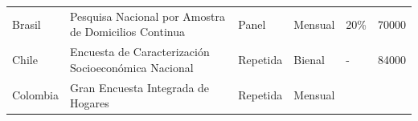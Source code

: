 \begin{longtable}[]{@{}llllll@{}}
\begin{minipage}[t]{0.13\columnwidth}
Brasil\strut
\end{minipage} & \begin{minipage}[t]{0.38\columnwidth}\raggedright
Pesquisa Nacional por Amostra de Domicilios Continua\strut
\end{minipage} & \begin{minipage}[t]{0.06\columnwidth}\raggedright
Panel\strut
\end{minipage} & \begin{minipage}[t]{0.08\columnwidth}\raggedright
Mensual\strut
\end{minipage} & \begin{minipage}[t]{0.06\columnwidth}\raggedright
20\%\strut
\end{minipage} & \begin{minipage}[t]{0.13\columnwidth}\raggedright
70000\strut
\end{minipage}\tabularnewline
\begin{minipage}[t]{0.13\columnwidth}\raggedright
Chile\strut
\end{minipage} & \begin{minipage}[t]{0.38\columnwidth}\raggedright
Encuesta de Caracterización Socioeconómica Nacional\strut
\end{minipage} & \begin{minipage}[t]{0.06\columnwidth}\raggedright
Repetida\strut
\end{minipage} & \begin{minipage}[t]{0.08\columnwidth}\raggedright
Bienal\strut
\end{minipage} & \begin{minipage}[t]{0.06\columnwidth}\raggedright
-\strut
\end{minipage} & \begin{minipage}[t]{0.13\columnwidth}\raggedright
84000\strut
\end{minipage}\tabularnewline
\begin{minipage}[t]{0.13\columnwidth}\raggedright
Colombia\strut
\end{minipage} & \begin{minipage}[t]{0.38\columnwidth}\raggedright
Gran Encuesta Integrada de Hogares\strut
\end{minipage} & \begin{minipage}[t]{0.06\columnwidth}\raggedright
Repetida\strut
\end{minipage} & \begin{minipage}[t]{0.08\columnwidth}\raggedright
Mensual\strut
\end{minipage} & \begin{minipage}[t]{0.06\columnwidth}\raggedright

\end{minipage}
\end{longtable}
